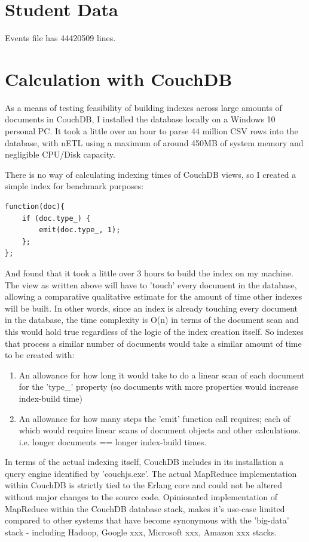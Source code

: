 % 

\section{Student Data}
Events file has 44420509 lines.

\section{Calculation with CouchDB}
As a means of testing feasibility of building indexes across large amounts of documents in CouchDB, I installed the database locally on a Windows 10 personal PC. It took a little over an hour to parse 44 million CSV rows into the database, with nETL using a maximum of around 450MB of system memory and negligible CPU/Disk capacity.

There is no way of calculating indexing times of CouchDB views, so I created a simple index for benchmark purposes:

\begin{verbatim}
function(doc){
    if (doc.type_) {
        emit(doc.type_, 1);
    };
};
\end{verbatim}

And found that it took a little over 3 hours to build the index on my machine. The view as written above will have to 'touch' every document in the database, allowing a comparative qualitative estimate for the amount of time other indexes will be built. In other words, since an index is already touching every document in the database, the time complexity is O(n) in terms of the document scan and this would hold true regardless of the logic of the index creation itself. So indexes that process a similar number of documents would take a similar amount of time to be created with:

\begin{enumerate}
    \item An allowance for how long it would take to do a linear scan of each document for the 'type\_' property (so documents with more properties would increase index-build time)
    \item An allowance for how many steps the 'emit' function call requires; each of which would require linear scans of document objects and other calculations. i.e. longer documents == longer index-build times.
\end{enumerate}

In terms of the actual indexing itself, CouchDB includes in its installation a query engine identified by 'couchjs.exe'. The actual MapReduce implementation within CouchDB is strictly tied to the Erlang core and could not be altered without major changes to the source code. Opinionated implementation of MapReduce within the CouchDB database stack, makes it's use-case limited compared to other systems that have become synonymous with the 'big-data' stack - including Hadoop, Google xxx, Microsoft xxx, Amazon xxx stacks.

